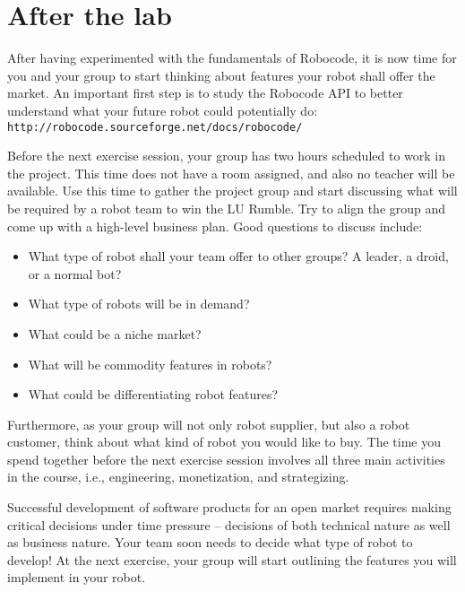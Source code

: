 \documentclass{scrreprt}
\begin{document}
\chapter{After the lab}
After having experimented with the fundamentals of Robocode, it is now time for you and your group to start thinking about features your robot shall offer the market. An important first step is to study the Robocode API to better understand what your future robot could potentially do: \texttt{http://robocode.sourceforge.net/docs/robocode/}

Before the next exercise session, your group has two hours scheduled to work in the project. This time does not have a room assigned, and also no teacher will be available. Use this time to gather the project group and start discussing what will be required by a robot team to win the LU Rumble. Try to align the group and come up with a high-level business plan. Good questions to discuss include:
\begin{itemize}
\item What type of robot shall your team offer to other groups? A leader, a droid, or a normal bot?
\item What type of robots will be in demand?
\item What could be a niche market?
\item What will be commodity features in robots?
\item What could be differentiating robot features?
\end{itemize}

Furthermore, as your group will not only robot supplier, but also a robot customer, think about what kind of robot you would like to buy. The time you spend together before the next exercise session involves all three main activities in the course, i.e., engineering, monetization, and strategizing.  

Successful development of software products for an open market requires making critical decisions under time pressure -- decisions of both technical nature as well as business nature. Your team soon needs to decide what type of robot to develop! At the next exercise, your group will start outlining the features you will implement in your robot.
\end{document}
